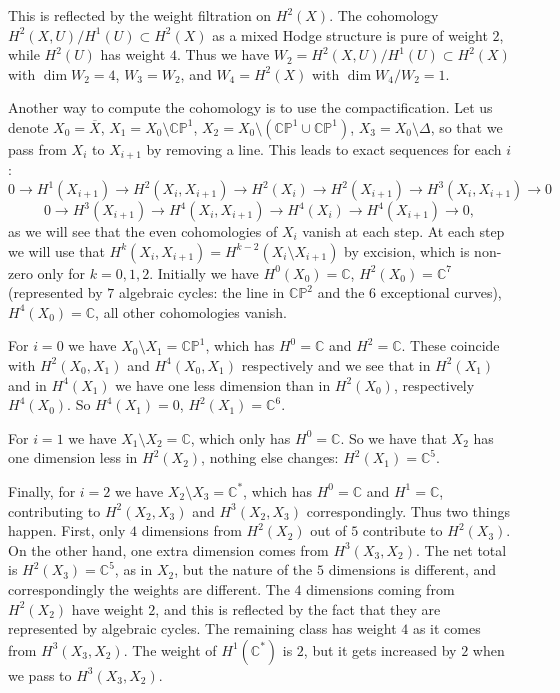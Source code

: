 \documentclass[12pt]{amsart}
\theoremstyle{definition}
\theoremstyle{remark}
\numberwithin{equation}{section}
\newcommand{\BC}{\mathbb C}
\newcommand{\BP}{\mathbb P}
\begin{document}
	This is reflected by the weight filtration on $H^2(X)$.  The cohomology $H^2(X,U)/H^1(U)\subset H^2(X)$ as a mixed Hodge structure is pure of weight $2$, while $H^2(U)$ has weight $4$. Thus we have $W_2 = H^2(X,U)/H^1(U)\subset H^2(X)$ with $\dim W_2=4$, $W_3=W_2$, and $W_4 = H^2(X)$ with $\dim W_4/W_2 = 1$.
	
	Another way to compute the cohomology is to use the compactification. Let us denote $X_0=\overline{X}$, $X_1 = X_0\setminus \BC\BP^1$, $X_2=X_0\setminus (\BC\BP^1 \cup \BC\BP^1)$, $X_3=X_0\setminus \Delta$, so that we pass from $X_i$ to $X_{i+1}$ by removing a line. This leads to exact sequences for each $i$:
	\[
	0\to H^1(X_{i+1})\to H^2(X_i, X_{i+1}) \to H^2(X_i)\to H^2(X_{i+1}) \to H^3(X_i,X_{i+1}) \to 0
	\]
	\[
	0\to H^3(X_{i+1}) \to H^4(X_i,X_{i+1}) \to H^4(X_i)\to H^4(X_{i+1}) \to 0,
	\]
	as we will see that the even cohomologies of $X_i$ vanish at each step. At each step we will use that $H^k(X_i, X_{i+1})=H^{k-2}(X_i\setminus X_{i+1})$ by excision, which is non-zero only for $k=0,1,2$.
	Initially we have $H^0(X_0)=\BC$, $H^2(X_0)=\BC^7$ (represented by $7$ algebraic cycles: the line in $\BC\BP^2$ and the $6$ exceptional curves), $H^4(X_0)=\BC$, all other cohomologies vanish. 
	
	For $i=0$ we have $X_0\setminus X_1=\BC\BP^1$, which has $H^0=\BC$ and $H^2=\BC$. These coincide with $H^2(X_0,X_1)$ and $H^4(X_0,X_1)$ respectively and we see that in $H^2(X_1)$ and in $H^4(X_1)$ we have one less dimension than in $H^2(X_0)$, respectively $H^4(X_0)$. So $H^4(X_1)=0$, $H^2(X_1)=\BC^6$.
	
	For $i=1$ we have $X_1\setminus X_2 = \BC$, which only has $H^0=\BC$. So we have that $X_2$ has one dimension less in $H^2(X_2)$, nothing else changes: $H^2(X_1)=\BC^5$.
	
	Finally, for $i=2$ we have $X_2\setminus X_3 = \BC^*$, which has $H^0=\BC$ and $H^1=\BC$, contributing to $H^2(X_2,X_3)$ and $H^3(X_2, X_3)$ correspondingly. Thus two things happen. First, only $4$ dimensions from $H^2(X_2)$ out of $5$ contribute to $H^2(X_3)$. On the other hand, one extra dimension comes from $H^3(X_3,X_2)$. The net total is $H^2(X_3)=\BC^5$, as in $X_2$, but the nature of the $5$ dimensions is different, and correspondingly the weights are different. The $4$ dimensions coming from $H^2(X_2)$ have weight $2$, and this is reflected by the fact that they are represented by algebraic cycles. The remaining class has weight $4$ as it comes from $H^3(X_3,X_2)$. The weight of $H^1(\BC^*)$ is $2$, but it gets increased by $2$ when we pass to $H^3(X_3,X_2)$. 
	
\end{document}
